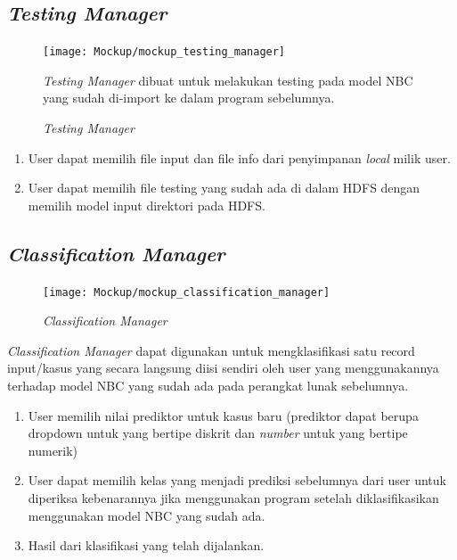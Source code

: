 \subsection{\textit{Testing Manager}}
\begin{figure}[H]
	\centering
	\texttt{[image: Mockup/mockup\_testing\_manager]}
	\caption[\textit{Testing Manager}]{\textit{Testing Manager}}
	\label{fig:Testing Manager}
\textit{Testing Manager} dibuat untuk melakukan testing pada model NBC yang sudah di-import ke dalam program sebelumnya.
\end{figure}
\begin{enumerate}
	\item User dapat memilih file input dan file info dari penyimpanan \textit{local} milik user.
	\item User dapat memilih file testing yang sudah ada di dalam HDFS dengan memilih model input direktori pada HDFS.
\end{enumerate}

\subsection{\textit{Classification Manager}}
\begin{figure}[H]
	\centering
	\texttt{[image: Mockup/mockup\_classification\_manager]}
	\caption[\textit{Classification Manager}]{\textit{Classification Manager}}
	\label{fig:Classification Manager}
\end{figure}
\textit{Classification Manager} dapat digunakan untuk mengklasifikasi satu record input/kasus yang secara langsung diisi sendiri oleh user yang menggunakannya terhadap model NBC yang sudah ada pada perangkat lunak sebelumnya.
\begin{enumerate}
	\item User memilih nilai prediktor untuk kasus baru (prediktor dapat berupa dropdown untuk yang bertipe diskrit dan \textit{number} untuk yang bertipe numerik)
	\item User dapat memilih kelas yang menjadi prediksi sebelumnya dari user untuk diperiksa kebenarannya jika menggunakan program setelah diklasifikasikan menggunakan model NBC yang sudah ada.
	\item Hasil dari klasifikasi yang telah dijalankan.
\end{enumerate}

